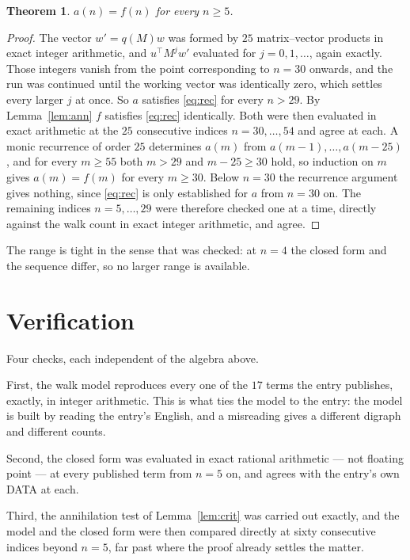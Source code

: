 \documentclass[11pt,a4paper]{article}
\theoremstyle{plain}
\newtheorem{theorem}{Theorem}
\theoremstyle{definition}
\begin{document}
\begin{theorem}
$a(n)=f(n)$ for every $n\ge5$.
\end{theorem}

\begin{proof}
The vector $w'=q(M)w$ was formed by $25$ matrix--vector products in exact integer
arithmetic, and $u^{\!\top}M^{j}w'$ evaluated for $j=0,1,\dots$, again exactly. Those integers
vanish from the point corresponding to $n=30$ onwards, and the run was continued until the
working vector was identically zero, which settles every larger $j$ at once. So $a$ satisfies
\eqref{eq:rec} for every $n>29$. By Lemma~\ref{lem:ann} $f$ satisfies \eqref{eq:rec}
identically. Both were then evaluated in exact arithmetic at the $25$ consecutive indices
$n=30,\dots,54$ and agree at each. A monic recurrence of order $25$
determines $a(m)$ from $a(m-1),\dots,a(m-25)$, and for every $m\ge55$ both
$m>29$ and $m-25\ge30$ hold, so induction on $m$ gives $a(m)=f(m)$ for every
$m\ge30$.
Below $n=30$ the recurrence argument gives nothing, since \eqref{eq:rec} is only
established for $a$ from $n=30$ on. The remaining indices $n=5,\dots,29$ were
therefore checked one at a time, directly against the walk count in exact integer arithmetic,
and agree.
\end{proof}

The range is tight in the sense that was checked: at $n=4$ the closed form and the sequence differ, so no larger range is available.

\section{Verification}

Four checks, each independent of the algebra above.

First, the walk model reproduces every one of the $17$ terms the entry publishes,
exactly, in integer arithmetic. This is what ties the model to the entry: the model is built
by reading the entry's English, and a misreading gives a different digraph and different
counts.

Second, the closed form was evaluated in exact rational arithmetic --- not floating point ---
at every published term from $n=5$ on, and agrees with the entry's own DATA at each.

Third, the annihilation test of Lemma~\ref{lem:crit} was carried out exactly, and the model
and the closed form were then compared directly at sixty consecutive indices beyond
$n=5$, far past where the proof already settles the matter.
\end{document}

